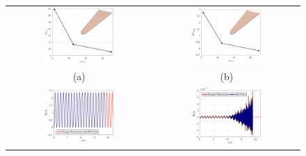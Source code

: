\begin{figure}[hbtp]
	\centering
	\begin{tabular}{cc}
		\includegraphics[width=0.5\textwidth]{Figures/Example3/EnergyBalance/TFinalv2.eps} &
		\includegraphics[width=0.5\textwidth]{Figures/Example3/EnergyBalance/DTv2.eps}\\(a)  &  (b)\\		
		\includegraphics[width=0.5\textwidth]{Figures/Example3/EnergyBalance/Energy.eps} &
		\includegraphics[width=0.5\textwidth]{Figures/Example3/EnergyBalance/DEnergy.eps}\\

\end{tabular}
\end{figure}
